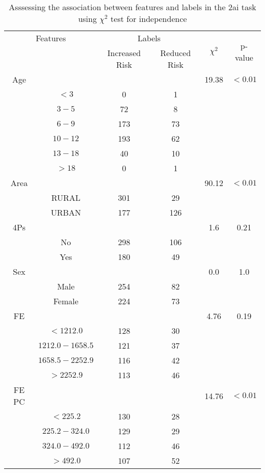 \begin{table}[!htb]
\centering
\caption{Asssessing the association between features and labels in the 2ai task using $\chi^2$ test for independence}
\label{tab:chitest_2ai}
\begin{tabular}{c c | c c| c | c}
\hline
\multicolumn{2}{c|}{Features}& \multicolumn{2}{c|}{Labels}& \multirow{2}{*}{$\chi^2$} & \multirow{2}{*}{p-value}\\ 
& & Increased Risk & Reduced Risk & & \\ 
\hline
Age &  &  & & 19.38 & $< 0.01$ \\ 
& $< 3$ & 0 & 1& & \\ 
& $3-5$ & 72 & 8& & \\ 
& $6-9$ & 173 & 73& & \\ 
& $10-12$ & 193 & 62& & \\ 
& $13-18$ & 40 & 10& & \\ 
& $> 18$ & 0 & 1& & \\ 
\hline 
Area &  &  & & 90.12 & $< 0.01$ \\ 
& RURAL & 301 & 29& & \\ 
& URBAN & 177 & 126& & \\ 
\hline 
4Ps &  &  & & 1.6 & 0.21 \\ 
& No & 298 & 106& & \\ 
& Yes & 180 & 49& & \\ 
\hline 
Sex &  &  & & 0.0 & 1.0 \\ 
& Male & 254 & 82& & \\ 
& Female & 224 & 73& & \\ 
\hline 
FE &  &  & & 4.76 & 0.19 \\ 
& $< 1212.0$ & 128 & 30& & \\ 
& $1212.0-1658.5$ & 121 & 37& & \\ 
& $1658.5-2252.9$ & 116 & 42& & \\ 
& $> 2252.9$ & 113 & 46& & \\ 
\hline 
FE PC &  &  & & 14.76 & $< 0.01$ \\ 
& $< 225.2$ & 130 & 28& & \\ 
& $225.2-324.0$ & 129 & 29& & \\ 
& $324.0-492.0$ & 112 & 46& & \\ 
& $> 492.0$ & 107 & 52& & \\ 
\hline 
\end{tabular}
\end{table}
